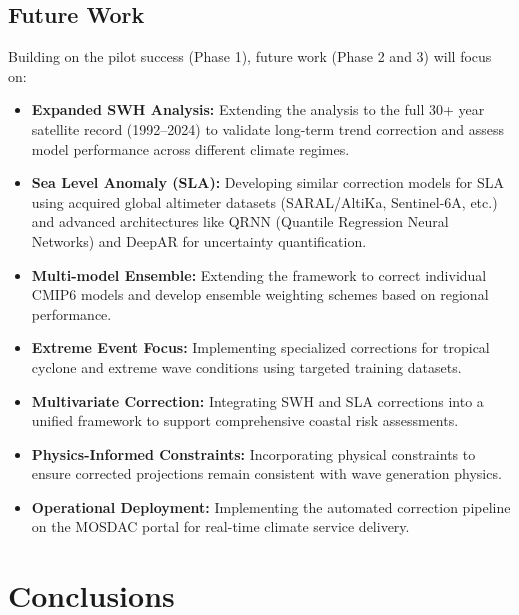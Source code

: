 \documentclass[twocolumn]{article}
\begin{document}
\subsection{Future Work}

Building on the pilot success (Phase 1), future work (Phase 2 and 3) will focus on:
\begin{itemize}
    \item \textbf{Expanded SWH Analysis:} Extending the analysis to the full 30+ year satellite record (1992--2024) to validate long-term trend correction and assess model performance across different climate regimes.
    \item \textbf{Sea Level Anomaly (SLA):} Developing similar correction models for SLA using acquired global altimeter datasets (SARAL/AltiKa, Sentinel-6A, etc.) and advanced architectures like QRNN (Quantile Regression Neural Networks) and DeepAR for uncertainty quantification.
    \item \textbf{Multi-model Ensemble:} Extending the framework to correct individual CMIP6 models and develop ensemble weighting schemes based on regional performance.
    \item \textbf{Extreme Event Focus:} Implementing specialized corrections for tropical cyclone and extreme wave conditions using targeted training datasets.
    \item \textbf{Multivariate Correction:} Integrating SWH and SLA corrections into a unified framework to support comprehensive coastal risk assessments.
    \item \textbf{Physics-Informed Constraints:} Incorporating physical constraints to ensure corrected projections remain consistent with wave generation physics.
    \item \textbf{Operational Deployment:} Implementing the automated correction pipeline on the MOSDAC portal for real-time climate service delivery.
\end{itemize}

\section{Conclusions}
\end{document}
